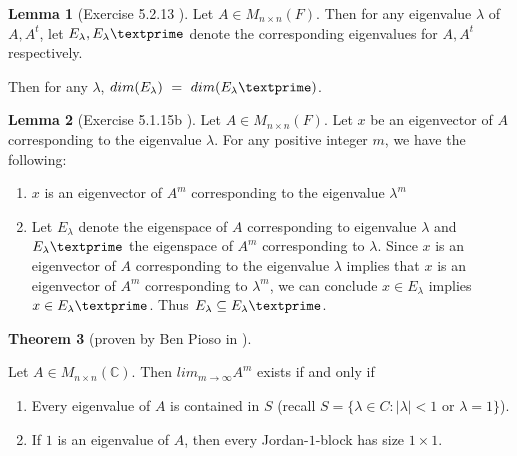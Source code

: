\documentclass{amsart}
\theoremstyle{definition}
\newtheorem{theorem}{Theorem}
\newtheorem{lemma}[theorem]{Lemma}
\theoremstyle{remark}
\numberwithin{equation}{section}
\begin{document}
\begin{lemma}[Exercise 5.2.13 \cite{friedberg2003linear}]\label{exercise5213}
Let $A \in M_{n \times n}(F)$.
Then for any eigenvalue $\lambda$ of $A, A^t$, let $E_{\lambda}, E_{\lambda}\textprime$ denote the corresponding eigenvalues for $A, A^t$ respectively.


Then for any $\lambda$, $dim(E_{\lambda})\ =\  dim(E_{\lambda}\textprime)$.

\end{lemma}

\begin{lemma}[Exercise 5.1.15b \cite{friedberg2003linear}]\label{exercise5115}
Let $A \in M_{n \times n}(F)$.
Let $x$ be an eigenvector of $A$ corresponding to the eigenvalue $\lambda$.
For any positive integer $m$, we have the following:

\begin{enumerate}
	\item 
		$x$ is an eigenvector of $A^m$ corresponding to the eigenvalue $\lambda^m$

	\item 
		Let $E_{\lambda}$ denote the eigenspace of $A$ corresponding to eigenvalue $\lambda$ and $E_{\lambda}\textprime$ the eigenspace of $A^m$ corresponding to $\lambda$.
		Since $x$ is an eigenvector of $A$ corresponding to the eigenvalue $\lambda$ implies that $x$ is an eigenvector of $A^m$ corresponding to $\lambda^m$, we can conclude $x \in E_{\lambda}$ implies $x \in E_{\lambda}\textprime$.
		Thus $E_{\lambda} \subseteq E_{\lambda}\textprime$.

\end{enumerate}

\end{lemma}

\begin{theorem}[proven by Ben Pioso in \cite{benspaper}]\label{benstheorem1}

Let $A \in M_{n \times n}(\mathbb{C})$.
Then $lim_{m \to \infty}A^m$ exists if and only if

	\begin{enumerate}
		\item Every eigenvalue of $A$ is contained in $S$ (recall $S = \{ \lambda \in C: |\lambda| < 1$ or $\lambda = 1\}$).

		\item If $1$ is an eigenvalue of $A$, then every Jordan-$1$-block has size $1 \times 1$.


	\end{enumerate}


\end{theorem}
\end{document}
